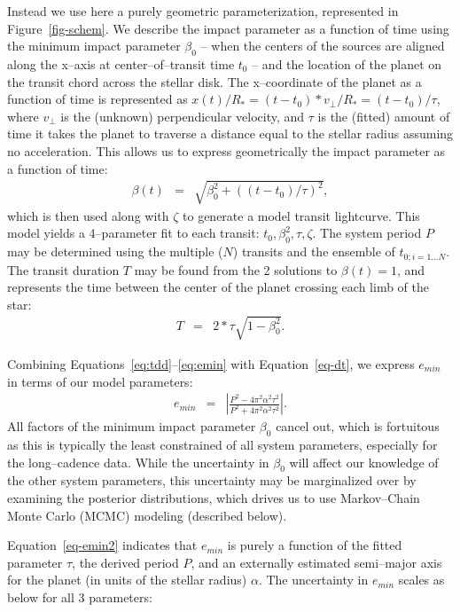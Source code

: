 Instead we use here a purely geometric parameterization, represented
in Figure~\ref{fig-schem}.  We describe the impact parameter as a
function of time using the minimum impact parameter $\beta_0$ -- when
the centers of the sources are aligned along the x--axis at
center--of--transit time $t_0$ -- and the location of the planet on
the transit chord across the stellar disk.  The x--coordinate of the
planet as a function of time is represented as $x(t) / R_* = (t - t_0)
* v_\perp / R_* = (t - t_0) / \tau$, where $v_\perp$ is the (unknown)
perpendicular velocity, and $\tau$ is the (fitted) amount of time it
takes the planet to traverse a distance equal to the stellar radius
assuming no acceleration.  This allows us to express geometrically the
impact parameter as a function of time:
\begin{eqnarray}
\beta(t) & = & \sqrt{\beta_0^2 + \left((t - t_0) / \tau\right)^2},
\end{eqnarray}
which is then used along with $\zeta$ to generate a model transit
lightcurve.
This model yields a 4--parameter fit to each transit: $t_0, \beta_0^2,
\tau, \zeta$.  The system period $P$ may be determined using the
multiple ($N$) transits and the ensemble of $t_{0;i=1...N}$.  The
transit duration $T$ may be found from the 2 solutions to $\beta(t) =
1$, and represents the time between the center of the planet crossing
each limb of the star:
\begin{eqnarray}
T & = & 2 * \tau \sqrt{1 - \beta_0^2}.
\label{eq-dt}
\end{eqnarray}

Combining Equations~\ref{eq:tdd}--\ref{eq:emin} with
Equation~\ref{eq-dt}, we express $e_{min}$ in terms of our model
parameters:
\begin{eqnarray}
e_{min} & = & \left| \frac{P^{2} - 4 \pi^{2} \alpha^{2} \tau^{2}}{P^{2} + 4 \pi^{2} \alpha^{2} \tau^{2}} \right|.
\label{eq-emin2}
\end{eqnarray}
All factors of the minimum impact parameter $\beta_0$ cancel out,
which is fortuitous as this is typically the least constrained of all
system parameters, especially for the long--cadence \kepler data.
While the uncertainty in $\beta_0$ will affect our knowledge of the
other system parameters, this uncertainty may be marginalized over by
examining the posterior distributions, which drives us to use
Markov--Chain Monte Carlo (MCMC) modeling (described below).

Equation~\ref{eq-emin2} indicates that $e_{min}$ is purely a function
of the fitted parameter $\tau$, the derived period $P$, and an
externally estimated semi--major axis for the planet (in units of the
stellar radius) $\alpha$.  The uncertainty in $e_{min}$ scales as
below for all 3 parameters:

